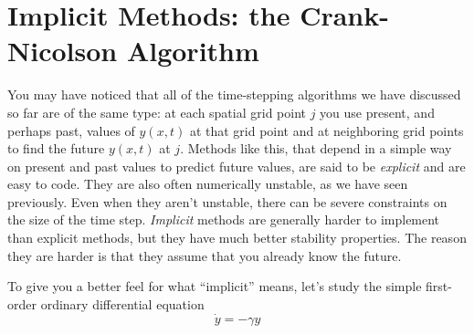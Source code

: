 
\chapter{Implicit Methods: the Crank-Nicolson Algorithm}
 \label{Lab:19}


 You may have noticed that all of the time-stepping algorithms we have
 discussed so far are of the same type: at each spatial grid point $j$
 you use present, and perhaps past, values of $y(x,t)$ at that grid
 point and at neighboring grid points to find the future $y(x,t)$ at
 $j$.  Methods like this, that depend in a
 simple way on present and past values to predict future values, are
 said to be {\it explicit} and are easy to code. They are also often
 numerically unstable, as we have seen previously.  Even when they
 aren't unstable, there can be severe constraints on the size of the
 time step.  {\it Implicit} methods are generally harder to implement
 than explicit methods, but they have much better stability
 properties. The reason they are harder is that they assume that you
 already know the future.


To give you a better feel for what ``implicit'' means, let's
study the simple first-order ordinary differential equation
\begin{equation}
    \dot{y} = -\gamma y
\end{equation}

